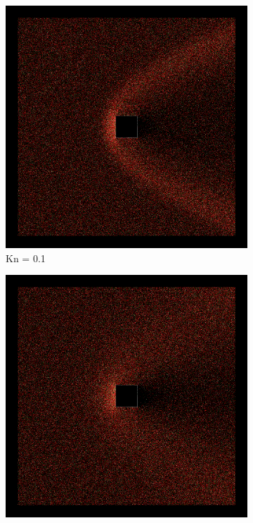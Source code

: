 \begin{figure}
    \centering
    \begin{subfigure}{0.32\textwidth}
        \centering
        \includegraphics[width=\textwidth]{Images/4. Results/Square Kn/particles/Kn0.1.png}
        \caption{Kn = 0.1}
    \end{subfigure}
    \hfill
    \begin{subfigure}{0.32\textwidth}
        \centering
        \includegraphics[width=\textwidth]{Images/4. Results/Square Kn/particles/Kn0.5.png}

\end{subfigure}
\end{figure}
